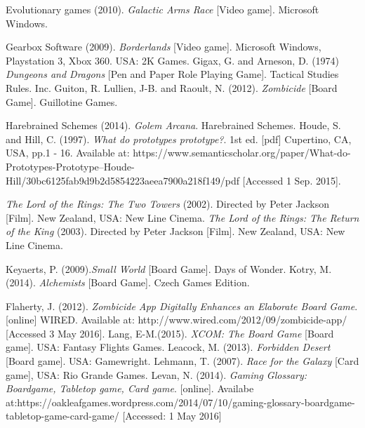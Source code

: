 \documentclass[a4paper,11pt]{article}
\begin{document}
\begin{thebibliography}{1}
Evolutionary games (2010). \textit{Galactic Arms Race} [Video game]. Microsoft Windows. 


Gearbox Software (2009). \textit{Borderlands} [Video game]. Microsoft Windows, Playstation 3, Xbox 360. USA: 2K Games.
Gigax, G. and Arneson, D. (1974) \textit{Dungeons and Dragons} [Pen and Paper Role Playing Game]. Tactical Studies Rules. Inc.
Guiton, R. Lullien, J-B. and Raoult, N. (2012). \textit{Zombicide} [Board Game]. Guillotine Games.

Harebrained Schemes (2014). \textit{Golem Arcana}. Harebrained Schemes.
Houde, S. and Hill, C. (1997). \textit{What do prototypes prototype?}. 1st ed. [pdf] Cupertino, CA, USA, pp.1 - 16. Available at: https://www.semanticscholar.org/paper/What-do-Prototypes-Prototype--Houde-Hill/30bc6125fab9d9b2d5854223aeea7900a218f149/pdf [Accessed 1 Sep. 2015].

\textit{The Lord of the Rings: The Two Towers} (2002). Directed by Peter Jackson [Film]. New Zealand, USA: New Line Cinema.
\textit{The Lord of the Rings: The Return of the King} (2003). Directed by Peter Jackson [Film]. New Zealand, USA: New Line Cinema.


Keyaerts, P. (2009).\textit{Small World} [Board Game]. Days of Wonder.
Kotry, M. (2014). \textit{Alchemists} [Board Game]. Czech Games Edition.

Flaherty, J. (2012). \textit{Zombicide App Digitally Enhances an Elaborate Board Game}. [online] WIRED. Available at: http://www.wired.com/2012/09/zombicide-app/ [Accessed 3 May 2016].
Lang, E-M.(2015). \textit{XCOM: The Board Game} [Board game]. USA: Fantasy Flights Games.
Leacock, M. (2013). \textit{Forbidden Desert} [Board game]. USA: Gamewright.
Lehmann, T. (2007). \textit{Race for the Galaxy} [Card game], USA: Rio Grande Games.
Levan, N. (2014). \textit{Gaming Glossary: Boardgame, Tabletop game, Card game}. [online]. Availabe at:https://oakleafgames.wordpress.com/2014/07/10/gaming-glossary-boardgame-tabletop-game-card-game/ [Accessed: 1 May 2016]


\end{thebibliography}
\end{document}
